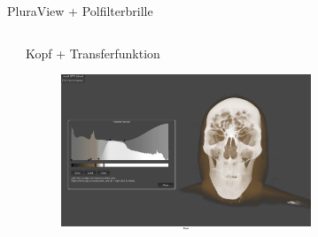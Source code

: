\documentclass[final,hyperref={pdfpagelabels=false}]{beamer}
\begin{document}
\begin{frame}[t]
\begin{columns}[t]
\begin{column}{0.465\textwidth}
\begin{block}{PluraView + Polfilterbrille}

\end{block}



\end{column} %



\begin{column}{.025\textwidth}\end{column} %

\end{columns} %

\begin{columns}[t] %

\begin{column}{.025\textwidth}\end{column} %

\begin{column}{.465\textwidth} %


\begin{block}{Kopf + Transferfunktion}
    \begin{figure}
    	\center
        \includegraphics[width=0.7\textwidth]{KopfTransferfunktion}
        
    \end{figure}

\end{block}



\end{column}
\end{columns}
\end{frame}
\end{document}
